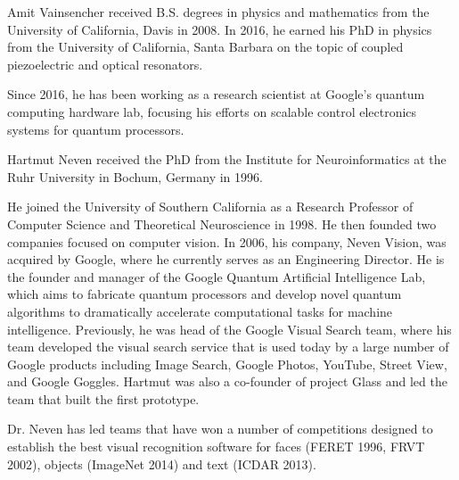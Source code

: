 \documentclass[journal]{IEEEtran}
\begin{document}
\begin{IEEEbiography}{Amit Vainsencher}  received B.S. degrees in physics and mathematics from the University of California, Davis in 2008. In 2016, he earned his PhD in physics from the University of California, Santa Barbara on the topic of coupled piezoelectric and optical resonators.

Since 2016, he has been working as a research scientist at Google’s quantum computing hardware lab, focusing his efforts on scalable control electronics systems for quantum processors.

\end{IEEEbiography}
\begin{IEEEbiography}Hartmut Neven received the PhD from the Institute for Neuroinformatics at the Ruhr University in Bochum, Germany in 1996.

He joined the University of Southern California as a Research Professor of Computer Science and Theoretical Neuroscience in 1998. He then founded two companies focused on computer vision. In 2006, his company,  Neven Vision, was acquired by Google, where he currently serves as an Engineering Director. He is the founder and manager of the Google Quantum Artificial Intelligence Lab, which aims to fabricate quantum processors and develop novel quantum algorithms to dramatically accelerate computational tasks for machine intelligence. Previously, he was head of the Google Visual Search team, where his team developed the visual search service that is used today by a large number of Google products including Image Search, Google Photos, YouTube, Street View, and Google Goggles. Hartmut was also a co-founder of project Glass and led the team that built the first prototype.

Dr. Neven has led teams that have won a number of competitions designed to establish the best visual recognition software for faces (FERET 1996, FRVT 2002), objects (ImageNet 2014) and text (ICDAR 2013).
\end{IEEEbiography}
\end{document}

